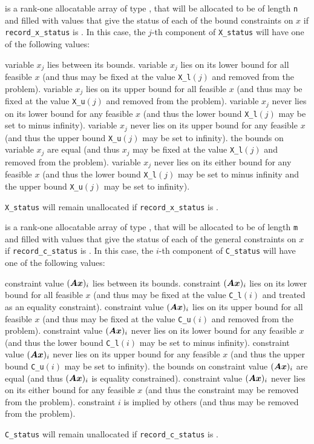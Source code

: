 \documentclass{galahad}
\begin{document}
\begin{description}
 is a rank-one allocatable array of type \integer,
that will be allocated to be of length {\tt n} and filled with values
that give the status of each of the bound constraints on $x$ if 
{\tt record\_x\_status} is \true. In this case, the $j$-th component of 
{\tt X\_status} will have one of the following values:
\begin{description}
 variable $x_j$ lies between its bounds.
 variable $x_j$ lies on its lower bound for all feasible $x$ (and thus 
may be fixed at the value {\tt X\_l}$(j)$ and removed from the problem).
 variable $x_j$ lies on its upper bound for all feasible $x$ 
(and thus 
may be fixed at the value {\tt X\_u}$(j)$ and removed from the problem).
 variable $x_j$ never lies on its lower bound for any feasible $x$ 
(and thus the lower bound {\tt X\_l}$(j)$ may be set to minus infinity).
 variable $x_j$ never lies on its upper bound for any feasible $x$ 
(and thus the upper bound {\tt X\_u}$(j)$ may be set to infinity).
 the bounds on variable $x_j$ are equal
(and thus $x_j$
may be fixed at the value {\tt X\_l}$(j)$ and removed from the problem).
 variable $x_j$ never lies on its either bound for any feasible $x$ 
(and thus the lower bound {\tt X\_l}$(j)$ may be set to minus infinity
and the upper bound {\tt X\_u}$(j)$ may be set to infinity).
\end{description}
{\tt X\_status} will remain unallocated if
{\tt record\_x\_status} is \false.

 is a rank-one allocatable array of  
type \integer, that will be allocated to be of length {\tt m}
and filled with values that give the status of each of the general constraints
on $x$ if {\tt record\_c\_status} is \true. In this case, the $i$-th
component of {\tt C\_status} will have one of the following values:
\begin{description}
 constraint value $({\bm{A}} {\bm{x}})_i$ lies between its bounds.
 constraint $({\bm{A}} {\bm{x}})_i$ lies on its lower bound for all feasible 
$x$ (and thus 
may be fixed at the value {\tt C\_l}$(i)$ and treated as an equality constraint).
 constraint value $({\bm{A}} {\bm{x}})_i$ lies on its upper bound for all 
feasible $x$ (and thus may be fixed at the value 
{\tt C\_u}$(i)$ and removed from the problem).
 constraint value $({\bm{A}} {\bm{x}})_i$ never lies on its lower bound for 
any feasible $x$ 
(and thus the lower bound {\tt C\_l}$(i)$ may be set to minus infinity).
 constraint value $({\bm{A}} {\bm{x}})_i$  never lies on its upper 
bound for any feasible $x$ 
(and thus the upper bound {\tt C\_u}$(i)$ may be set to infinity).
 the bounds on constraint value $({\bm{A}} {\bm{x}})_i$ are equal
(and thus $({\bm{A}} {\bm{x}})_i$ is equality constrained).
 constraint value $({\bm{A}} {\bm{x}})_i$ never lies on its either bound for any 
feasible $x$ (and thus the constraint may be removed from the problem).
 constraint $i$ is implied by others 
(and thus may be removed from the problem).
\end{description}
{\tt C\_status} will remain unallocated if
{\tt record\_c\_status} is \false.


\end{description}
\end{document}
